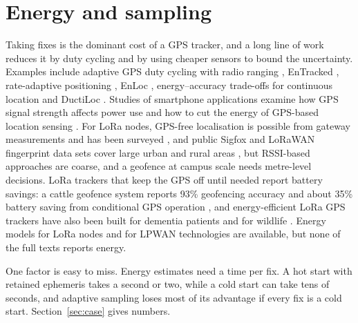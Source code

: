 \documentclass[preprint,12pt]{elsarticle}
\begin{document}
\section{Energy and sampling}\label{sec:energy}
Taking fixes is the dominant cost of a GPS tracker, and a long line of work reduces it by duty cycling and by using cheaper sensors to bound the uncertainty. Examples include adaptive GPS duty cycling with radio ranging \cite{jurdak2010adaptive}, EnTracked \cite{kjaergaard2009entracked}, rate-adaptive positioning \cite{paek2010raps}, EnLoc \cite{constandache2009enloc}, energy--accuracy trade-offs for continuous location \cite{lin2010aloc} and DuctiLoc \cite{katsikouli2023ductiloc}. Studies of smartphone applications examine how GPS signal strength affects power use and how to cut the energy of GPS-based location sensing \cite{@115,@152}. For LoRa nodes, GPS-free localisation is possible from gateway measurements \cite{fargas2017gpsfree} and has been surveyed \cite{@465,@466,@67,@3255}, and public Sigfox and LoRaWAN fingerprint data sets cover large urban and rural areas \cite{@34}, but RSSI-based approaches are coarse, and a geofence at campus scale needs metre-level decisions. LoRa trackers that keep the GPS off until needed report battery savings: a cattle geofence system reports 93\% geofencing accuracy and about 35\% battery saving from conditional GPS operation \cite{@1235}, and energy-efficient LoRa GPS trackers have also been built for dementia patients and for wildlife \cite{@206,lopezescobar2025wildlife}. Energy models for LoRa nodes \cite{bouguera2018energy,casals2017energy} and for LPWAN technologies \cite{@55} are available, but none of the \ftN{} full texts reports energy.

One factor is easy to miss. Energy estimates need a time per fix. A hot start with retained ephemeris takes a second or two, while a cold start can take tens of seconds, and adaptive sampling loses most of its advantage if every fix is a cold start. Section~\ref{sec:case} gives numbers.

\end{document}
